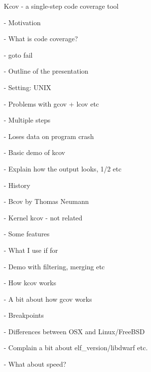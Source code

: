 Kcov - a single-step code coverage tool

- Motivation

  - What is code coverage?

  - goto fail

- Outline of the presentation


- Setting: UNIX


- Problems with gcov + lcov etc

  - Multiple steps

  - Loses data on program crash


- Basic demo of kcov

  - Explain how the output looks, 1/2 etc

- History

  - Bcov by Thomas Neumann

  - Kernel kcov - not related

- Some features

  - What I use if for

  - Demo with filtering, merging etc


- How kcov works

  - A bit about how gcov works

  - Breakpoints

  - Differences between OSX and Linux/FreeBSD

  - Complain a bit about elf_version/libdwarf etc.


- What about speed?
